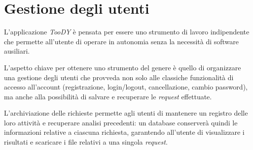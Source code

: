 \documentclass[12pt]{report}
\newcommand{\toody}{\textsl{TooDY}\xspace}
\begin{document}
\section{Gestione degli utenti}
L'applicazione \toody è pensata per essere uno strumento di lavoro indipendente che permette all'utente di operare in autonomia senza la necessità di software ausiliari.

L'aspetto chiave per ottenere uno strumento del genere è quello di organizzare una gestione degli utenti che provveda non solo alle classiche funzionalità di accesso all'account (registrazione, login/logout, cancellazione, cambio password), ma anche alla possibilità di salvare e recuperare le \textit{request} effettuate.

L'archiviazione delle richieste permette agli utenti di mantenere un registro delle loro attività e recuperare analisi precedenti: un database conserverà quindi le informazioni relative a ciascuna richiesta, garantendo all'utente di visualizzare i risultati e scaricare i file relativi a una singola \textit{request}.
\end{document}
